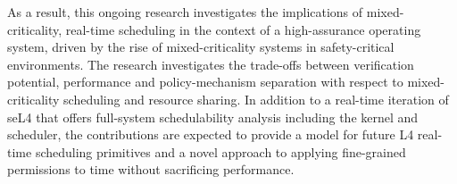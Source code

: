 As a result, this ongoing research investigates the implications of mixed-criticality, real-time scheduling in the context of a high-assurance operating system, driven by the rise of mixed-criticality systems in safety-critical environments.
The research investigates the trade-offs between verification potential, performance and policy-mechanism separation with respect to mixed-criticality scheduling and resource sharing.
In addition to a real-time iteration of seL4 that offers full-system schedulability analysis including the kernel and scheduler, the contributions are expected to provide a model for future L4 real-time scheduling primitives and a novel approach to applying fine-grained permissions to time without sacrificing performance.


